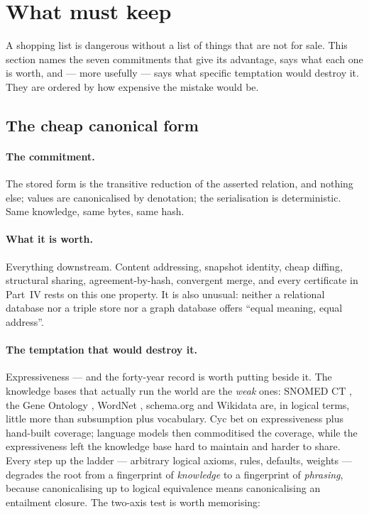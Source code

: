 \section{What \odag{} must keep}
\label{sec:keep}

A shopping list is dangerous without a list of things that are not for sale.
This section names the seven commitments that give \odag{} its advantage, says
what each one is worth, and --- more usefully --- says what specific
temptation would destroy it. They are ordered by how expensive the mistake
would be.

\subsection{The cheap canonical form}
\label{sec:keep-canonical}

\paragraph{The commitment.} The stored form is the transitive reduction of the
asserted relation, and nothing else; values are canonicalised by denotation;
the serialisation is deterministic. Same knowledge, same bytes, same hash.

\paragraph{What it is worth.} Everything downstream. Content addressing,
snapshot identity, cheap diffing, structural sharing, agreement-by-hash,
convergent merge, and every certificate in Part~IV rests on this one property.
It is also unusual: neither a relational database nor a triple store nor a
graph database offers ``equal meaning, equal address''.

\paragraph{The temptation that would destroy it.} Expressiveness --- and the
forty-year record is worth putting beside it. The knowledge bases that
actually run the world are the \emph{weak} ones: SNOMED CT
\citep{spackman1997}, the Gene Ontology \citep{ashburner2000}, WordNet
\citep{miller1995}, schema.org \citep{guha2016} and Wikidata
\citep{vrandecic2014} are, in logical terms, little more than subsumption
plus vocabulary. Cyc \citep{lenat1995} bet on expressiveness plus hand-built
coverage; language models then commoditised the coverage, while the
expressiveness left the knowledge base hard to maintain and harder to share.
Every step
up the ladder --- arbitrary logical axioms, rules, defaults, weights ---
degrades the root from a fingerprint of \emph{knowledge} to a fingerprint of
\emph{phrasing}, because canonicalising up to logical equivalence means
canonicalising an entailment closure. The two-axis test is worth memorising:

